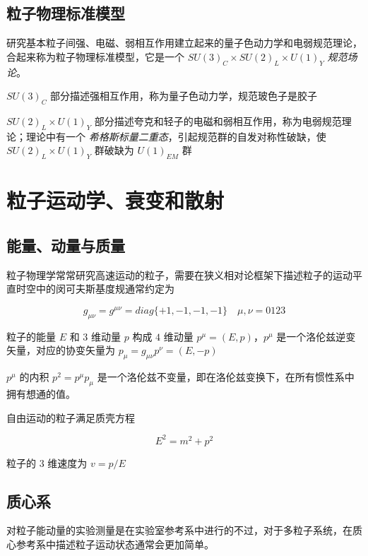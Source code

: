 \subsection{粒子物理标准模型}

研究基本粒子间强、电磁、弱相互作用建立起来的量子色动力学和电弱规范理论，合起来称为粒子物理标准模型，它是一个 $SU(3)_C \times SU(2)_L \times U(1)_Y$ \emph{规范场论}。

$SU(3)_C$ 部分描述强相互作用，称为量子色动力学，规范玻色子是胶子

$SU(2)_L \times U(1)_Y$ 部分描述夸克和轻子的电磁和弱相互作用，称为电弱规范理论；理论中有一个 \emph{希格斯标量二重态}，引起规范群的自发对称性破缺，使 $SU(2)_L \times U(1)_Y$ 群破缺为 $U(1)_{EM}$ 群

\section{粒子运动学、衰变和散射}

\subsection{能量、动量与质量}

粒子物理学常常研究高速运动的粒子，需要在狭义相对论框架下描述粒子的运动平直时空中的闵可夫斯基度规通常约定为

\begin{equation}
    g_{\mu\nu}=g^{\mu\nu}=diag\{+1,-1,-1,-1\}\quad \mu,\nu=0123
\end{equation}

粒子的能量 $E$ 和 $3$ 维动量 $p$ 构成 $4$ 维动量 $p^\mu=(E,p)$，$p^\mu$ 是一个洛伦兹逆变矢量，对应的协变矢量为 $p_\mu=g_{\mu\nu} p^\nu=(E,-p)$

$p^\mu$ 的内积 $p^2=p^\mu p_\mu$ 是一个洛伦兹不变量，即在洛伦兹变换下，在所有惯性系中拥有想通的值。

自由运动的粒子满足质壳方程

\begin{equation}
    E^2 = m^2 + p^2
\end{equation}

粒子的 $3$ 维速度为 $v=p/E$

\subsection{质心系}

对粒子能动量的实验测量是在实验室参考系中进行的不过，对于多粒子系统，在质心参考系中描述粒子运动状态通常会更加简单。

